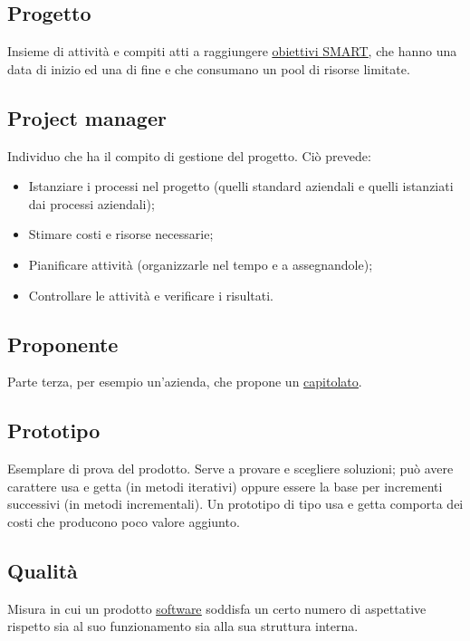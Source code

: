 	\subsection{Progetto}
	\label{sec:progetto}
	Insieme di attività e compiti atti a raggiungere \underline{\hyperref[sec:smart]{obiettivi SMART}}, che hanno una data di inizio ed una di fine e che consumano un pool di risorse limitate.

	
	\subsection{Project manager}
	\label{sec:projectmanager}
	Individuo che ha il compito di gestione del progetto. Ciò prevede:
	\begin{itemize}
	\item Istanziare i processi nel progetto (quelli standard aziendali e quelli istanziati dai processi aziendali);
	\item Stimare costi e risorse necessarie;
	\item Pianificare attività (organizzarle nel tempo e a assegnandole);
	\item Controllare le attività e verificare i risultati.
	\end{itemize}


	\subsection{Proponente}
	\label{sec:proponente}
	Parte terza, per esempio un'azienda, che propone un \underline{\hyperref[sec:capitolato]{capitolato}}. 

	
	\subsection{Prototipo}
	\label{sec:prototipo}
	Esemplare di prova del prodotto. Serve a provare e scegliere soluzioni; può avere carattere usa e getta (in metodi iterativi) oppure essere la base per incrementi successivi (in metodi incrementali).
	Un prototipo di tipo usa e getta comporta dei costi che producono poco valore aggiunto.


	\newpage

	
	\subsection{Qualità}
	\label{sec:qualita}
	 Misura in cui un prodotto \underline{\hyperref[sec:prodottosoftware]{software}} soddisfa un certo numero di aspettative rispetto sia al suo funzionamento sia alla sua struttura interna.
